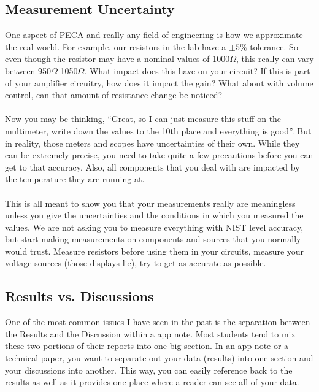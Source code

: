 \documentclass{hitec}
\begin{document}
\subsection{Measurement Uncertainty}
One aspect of PECA and really any field of engineering is how we approximate the real world. For example, our resistors in the lab have a $\pm5\%$ tolerance. So even though the resistor may have a nominal values of 1000$\Omega$, this really can vary between 950$\Omega$-1050$\Omega$. What impact does this have on your circuit? If this is part of your amplifier circuitry, how does it impact the gain? What about with volume control, can that amount of resistance change be noticed?
\\
\\
\noindent
Now you may be thinking, ``Great, so I can just measure this stuff on the multimeter, write down the values to the 10th place and everything is good''. But in reality, those meters and scopes have uncertainties of their own. While they can be extremely precise, you need to take quite a few precautions before you can get to that accuracy. Also, all components that you deal with are impacted by the temperature they are running at. 
\\
\\
\noindent
This is all meant to show you that your measurements really are meaningless unless you give the uncertainties and the conditions in which you measured the values. We are not asking you to measure everything with NIST level accuracy, but start making measurements on components and sources that you normally would trust. Measure resistors before using them in your circuits, measure your voltage sources (those displays lie), try to get as accurate as possible.

\subsection{Results vs. Discussions}
One of the most common issues I have seen in the past is the separation between the Results and the Discussion within a app note. Most students tend to mix these two portions of their reports into one big section. In an app note or a technical paper, you want to separate out your data (results) into one section and your discussions into another. This way, you can easily reference back to the results as well as it provides one place where a reader can see all of your data.
\end{document}
